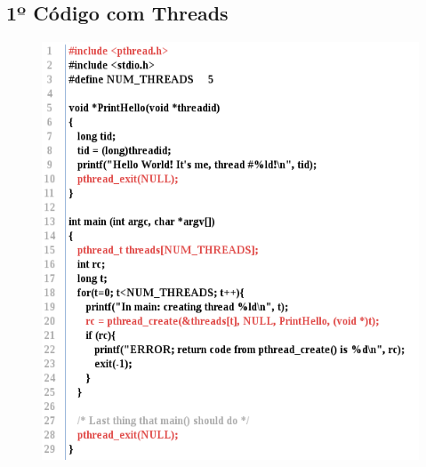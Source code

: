 \documentclass[10pt, xcolor=x11names]{beamer}
\begin{document}
\subsection{1º Código com Threads}
\begin{frame}

	\begin{figure}
		\includegraphics[width=.7\linewidth]{img/code-thread.png}
	\end{figure}
		

		
\end{frame}
\end{document}
